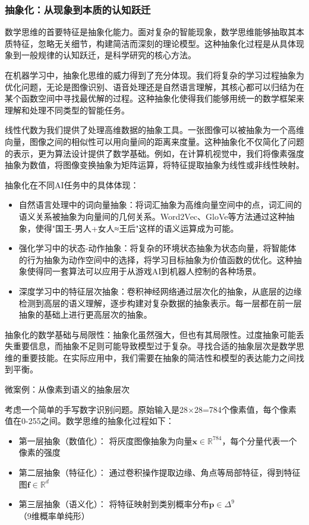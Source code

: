 \subsubsection{抽象化：从现象到本质的认知跃迁}

数学思维的首要特征是抽象化能力。面对复杂的智能现象，数学思维能够抽取其本质特征，忽略无关细节，构建简洁而深刻的理论模型。这种抽象化过程是从具体现象到一般规律的认知跃迁，是科学研究的核心方法。

在机器学习中，抽象化思维的威力得到了充分体现。我们将复杂的学习过程抽象为优化问题，无论是图像识别、语音处理还是自然语言理解，其核心都可以归结为在某个函数空间中寻找最优解的过程。这种抽象化使得我们能够用统一的数学框架来理解和处理不同类型的智能任务。

线性代数为我们提供了处理高维数据的抽象工具。一张图像可以被抽象为一个高维向量，图像之间的相似性可以用向量间的距离来度量。这种抽象化不仅简化了问题的表示，更为算法设计提供了数学基础。例如，在计算机视觉中，我们将像素强度抽象为数值，将图像变换抽象为矩阵运算，将特征提取抽象为线性或非线性映射。

抽象化在不同AI任务中的具体体现：

\begin{itemize}
\item 自然语言处理中的词向量抽象：将词汇抽象为高维向量空间中的点，词汇间的语义关系被抽象为向量间的几何关系。Word2Vec、GloVe等方法通过这种抽象，使得"国王-男人+女人≈王后"这样的语义运算成为可能。
\item 强化学习中的状态-动作抽象：将复杂的环境状态抽象为状态向量，将智能体的行为抽象为动作空间中的选择，将学习目标抽象为价值函数的优化。这种抽象使得同一套算法可以应用于从游戏AI到机器人控制的各种场景。
\item 深度学习中的特征层次抽象：卷积神经网络通过层次化的抽象，从底层的边缘检测到高层的语义理解，逐步构建对复杂数据的抽象表示。每一层都在前一层抽象的基础上进行更高层次的抽象。
\end{itemize}

抽象化的数学基础与局限性：抽象化虽然强大，但也有其局限性。过度抽象可能丢失重要信息，而抽象不足则可能导致模型过于复杂。寻找合适的抽象层次是数学思维的重要技能。在实际应用中，我们需要在抽象的简洁性和模型的表达能力之间找到平衡。

微案例：从像素到语义的抽象层次

考虑一个简单的手写数字识别问题。原始输入是28×28=784个像素值，每个像素值在0-255之间。数学思维的抽象化过程如下：

\begin{itemize}
\item 第一层抽象（数值化）： 将灰度图像抽象为向量$\mathbf{x} \in \mathbb{R}^{784}$，每个分量代表一个像素的强度
\item 第二层抽象（特征化）： 通过卷积操作提取边缘、角点等局部特征，得到特征图$\mathbf{f} \in \mathbb{R}^{d}$
\item 第三层抽象（语义化）： 将特征映射到类别概率分布$\mathbf{p} \in \Delta^{9}$（9维概率单纯形）
\end{itemize}

